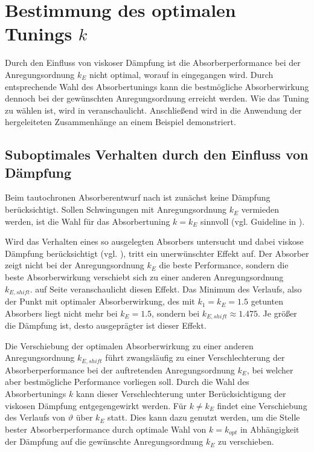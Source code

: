 \chapter{Bestimmung des optimalen Tunings \texorpdfstring{$k$}{k}} \label{cha:Optimierung}

Durch den Einfluss von viskoser Dämpfung ist die Absorberperformance
bei der Anregungsordnung $k_E$ nicht optimal, worauf in 
 eingegangen wird.
%
Durch entsprechende Wahl des Absorbertunings kann die
bestmögliche Absorberwirkung dennoch bei der gewünschten Anregungsordnung erreicht werden.
Wie das Tuning zu wählen ist, wird in   veranschaulicht.
Anschließend wird in  
die Anwendung der hergeleiteten Zusammenhänge an einem Beispiel demonstriert.

\section{Suboptimales Verhalten durch den Einfluss von Dämpfung}
\label{sec:Opt:SuboptDurchDaempfung}

Beim tautochronen Absorberentwurf nach  ist zunächst
keine Dämpfung berücksichtigt. 
Sollen Schwingungen mit Anregungsordnung $k_E$ vermieden werden, ist
die Wahl für das Absorbertuning $k=k_E$ sinnvoll (vgl. Guideline in \cite{Mayet:Tautochronic}).

Wird das Verhalten eines so ausgelegten Absorbers untersucht und dabei viskose Dämpfung berücksichtigt
(vgl. ), tritt ein unerwünschter Effekt auf.
Der Absorber zeigt nicht bei der Anregungsordnung $k_E$ die beste Performance,
sondern die beste Absorberwirkung verschiebt sich zu einer anderen Anregungsordnung $k_{E,shift}$. 
 auf Seite \pageref{fig:Opt:Beispiel:Optimalesk1GanzerZoom} veranschaulicht diesen Effekt.
Das Minimum des Verlaufs, also der Punkt mit optimaler Absorberwirkung,  
des mit $k_1=k_E=1.5$ getunten Absorbers liegt nicht mehr bei $k_E = 1.5$, sondern
bei $k_{E,shift}\approx1.475$.
Je größer die  Dämpfung ist, desto ausgeprägter ist dieser Effekt.

Die Verschiebung der optimalen Absorberwirkung zu einer anderen Anregungsordnung $k_{E,shift}$
führt zwangsläufig zu einer Verschlechterung der Absorberperformance bei der
auftretenden Anregungsordnung $k_E$, bei welcher aber bestmögliche Performance vorliegen soll.
Durch die  Wahl des Absorbertunings $k$ kann dieser Verschlechterung unter Berücksichtigung 
der viskosen Dämpfung entgegengewirkt werden. 
Für $k\neq k_E$ findet eine Verschiebung des Verlaufs von $\vartheta$ über $k_E$ statt.
Dies kann dazu genutzt werden, um die Stelle bester
Absorberperformance durch optimale Wahl von $k=k_{opt}$ in Abhängigkeit der Dämpfung
auf die gewünschte Anregungsordnung $k_E$ zu verschieben.

